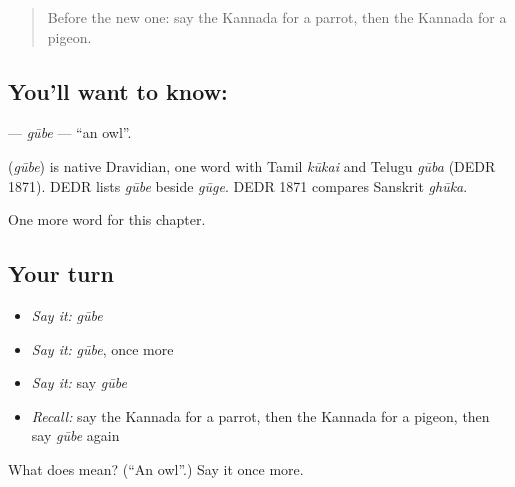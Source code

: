 \label{lesson:KA-C131-gube}



\begin{quote}
Before the new one: say the Kannada for a parrot, then the Kannada for a pigeon.
\end{quote}

\subsection*{You'll want to know: }
\textbf{} — \emph{gūbe} — \textquotedblleft{}an owl\textquotedblright{}.

\begin{cousinweb}
\textbf{} (\emph{gūbe}) is native Dravidian, one word with Tamil \emph{kūkai} and Telugu \emph{gūba} (DEDR 1871). DEDR lists \emph{gūbe} beside \emph{gūge}. DEDR 1871 compares Sanskrit \emph{ghūka}.
\end{cousinweb}

\begin{grammarlens}[title={What you've built}]
One more word for this chapter.
\end{grammarlens}

\subsection*{Your turn}
\begin{itemize}
\raggedright
  \item \emph{Say it:} \emph{gūbe}
  \item \emph{Say it:} \emph{gūbe}, once more
  \item \emph{Say it:} say \emph{gūbe}
  \item \emph{Recall:} say the Kannada for a parrot, then the Kannada for a pigeon, then say \emph{gūbe} again
\end{itemize}

\begin{tcolorbox}[breakable,colback=teal!4,colframe=teal!35!black,title={Before you move on}]
What does  mean? (\textquotedblleft{}An owl\textquotedblright{}.) Say it once more.
\end{tcolorbox}
